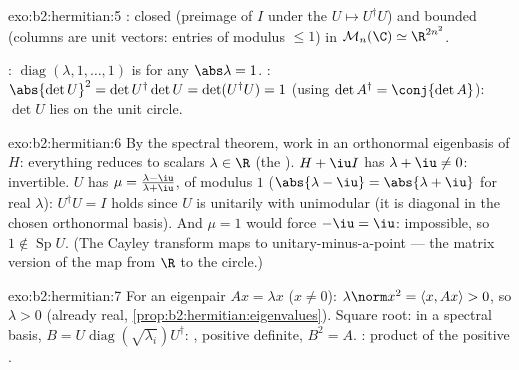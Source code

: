 \begin{solution}{exo:b2:hermitian:5}
: closed (preimage of $I$ under the  $U \mapsto
U^\dagger U$) and bounded (columns are unit vectors: entries of
modulus $\leq 1$) in $\mathcal{M}_n(\C) \simeq \R^{2n^2}$.

: $\operatorname{diag}(\lambda, 1, \dots, 1)$ is 
for any $\abs\lambda = 1$. : $\abs{\det U}^2 = \det
U^\dagger \det U = \det(U^\dagger U) = 1$ (using $\det A^\dagger =
\conj{\det A}$): $\det U$ lies on the unit circle.
\end{solution}

\begin{solution}{exo:b2:hermitian:6}
By the spectral theorem, work in an orthonormal eigenbasis of $H$:
everything reduces to scalars $\lambda \in \R$ (the ).
$H + \iu I$ has  $\lambda + \iu \neq 0$: invertible. $U$
has  $\mu = \frac{\lambda - \iu}{\lambda + \iu}$, of
modulus $1$ ($\abs{\lambda - \iu} = \abs{\lambda + \iu}$ for real
$\lambda$): $U^\dagger U = I$ holds since $U$ is unitarily
 with unimodular  (it is diagonal in the
chosen orthonormal basis). And $\mu = 1$ would force $-\iu = \iu$:
impossible, so $1 \notin \operatorname{Sp} U$. (The Cayley
transform maps  to unitary-minus-a-point --- the matrix
version of the map from $\R$ to the circle.)
\end{solution}

\begin{solution}{exo:b2:hermitian:7}
For an eigenpair $Ax = \lambda x$ ($x \neq 0$): $\lambda\norm x^2 =
\langle x, Ax\rangle > 0$, so $\lambda > 0$ (already real,
\cref{prop:b2:hermitian:eigenvalues}). Square root: in a spectral
basis, $B = U\operatorname{diag}(\sqrt{\lambda_i})U^\dagger$:
, positive definite, $B^2 = A$. : product of
the positive .
\end{solution}

